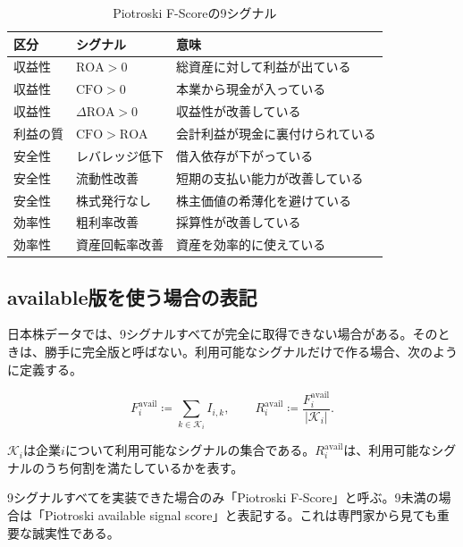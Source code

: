 \documentclass[11pt,a4paper]{article}
\newcommand{\CFO}{\mathrm{CFO}}
\begin{document}
\begin{table}[tbp]
\caption{Piotroski F-Scoreの9シグナル}
\label{tab:piotroski}
\centering
\scriptsize
\begin{tabularx}{\linewidth}{p{22mm}p{30mm}Y}
\toprule
区分 & シグナル & 意味 \\
\midrule
収益性 & $\mathrm{ROA}>0$ & 総資産に対して利益が出ている \\
収益性 & $\CFO>0$ & 本業から現金が入っている \\
収益性 & $\Delta\mathrm{ROA}>0$ & 収益性が改善している \\
利益の質 & $\CFO>\mathrm{ROA}$ & 会計利益が現金に裏付けられている \\
安全性 & レバレッジ低下 & 借入依存が下がっている \\
安全性 & 流動性改善 & 短期の支払い能力が改善している \\
安全性 & 株式発行なし & 株主価値の希薄化を避けている \\
効率性 & 粗利率改善 & 採算性が改善している \\
効率性 & 資産回転率改善 & 資産を効率的に使えている \\
\bottomrule
\end{tabularx}
\end{table}

\subsection{available版を使う場合の表記}

日本株データでは、9シグナルすべてが完全に取得できない場合がある。そのときは、勝手に完全版と呼ばない。利用可能なシグナルだけで作る場合、次のように定義する。

\begin{equation}
F^{\mathrm{avail}}_i \coloneqq \sum_{k\in \mathcal{K}_i} I_{i,k},
\qquad
R^{\mathrm{avail}}_i \coloneqq \frac{F^{\mathrm{avail}}_i}{\lvert\mathcal{K}_i\rvert}.
\label{eq:piotroski-avail}
\end{equation}

$\mathcal{K}_i$は企業$i$について利用可能なシグナルの集合である。$R^{\mathrm{avail}}_i$は、利用可能なシグナルのうち何割を満たしているかを表す。

\begin{warnbox}[表記上の注意]
9シグナルすべてを実装できた場合のみ「Piotroski F-Score」と呼ぶ。9未満の場合は「Piotroski available signal score」と表記する。これは専門家から見ても重要な誠実性である。
\end{warnbox}
\end{document}
